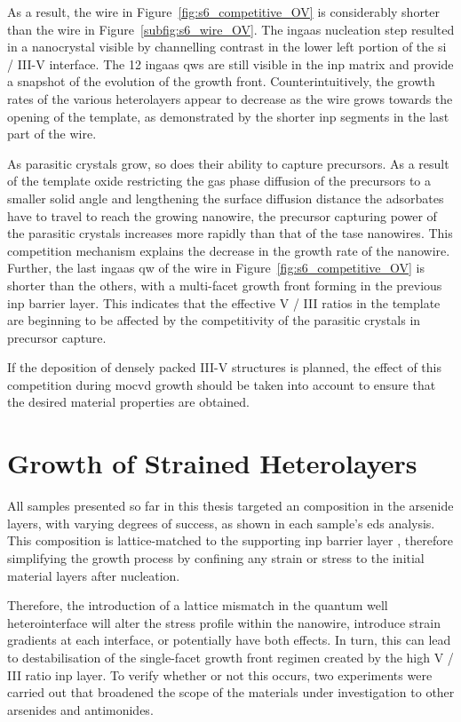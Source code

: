 As a result, the wire in Figure~\ref{fig:s6_competitive_OV} is considerably shorter than the wire in Figure~\ref{subfig:s6_wire_OV}. The \acs{ingaas} nucleation step resulted in a nanocrystal visible by channelling contrast in the lower left portion of the \acs{si} / III-V interface. The \num{12} \acs{ingaas} \acl{qw}s are still visible in the \acs{inp} matrix and provide a snapshot of the evolution of the growth front. Counterintuitively, the growth rates of the various heterolayers appear to decrease as the wire grows towards the opening of the template, as demonstrated by the shorter \acs{inp} segments in the last part of the wire. 

As parasitic crystals grow, so does their ability to capture precursors. As a result of the template oxide restricting the gas phase diffusion of the precursors to a smaller solid angle and lengthening the surface diffusion distance the adsorbates have to travel to reach the growing nanowire, the precursor capturing power of the parasitic crystals increases more rapidly than that of the \acs{tase} nanowires. This competition mechanism explains the decrease in the growth rate of the nanowire. Further, the last \acs{ingaas} \acl{qw} of the wire in Figure~\ref{fig:s6_competitive_OV} is shorter than the others, with a multi-facet growth front forming in the previous \acs{inp} barrier layer. This indicates that the effective V / III ratios in the template are beginning to be affected by the competitivity of the parasitic crystals in precursor capture.

If the deposition of densely packed III-V structures is planned, the effect of this competition during \acs{mocvd} growth should be taken into account to ensure that the desired material properties are obtained.

\section{Growth of Strained Heterolayers}

All samples presented so far in this thesis targeted an  composition in the arsenide layers, with varying degrees of success, as shown in each sample's \acs{eds} analysis. This composition is lattice-matched to the supporting \acs{inp} barrier layer \cite{Pearsall1980, Sugii1983, Wagner1970}, therefore simplifying the growth process by confining any strain or stress to the initial material layers after nucleation.

Therefore, the introduction of a lattice mismatch in the quantum well heterointerface will alter the stress profile within the nanowire, introduce strain gradients at each interface, or potentially have both effects. In turn, this can lead to destabilisation of the  single-facet growth front regimen created by the high V / III ratio \acs{inp} layer. To verify whether or not this occurs, two experiments were carried out that broadened the scope of the materials under investigation to other arsenides and antimonides. 

